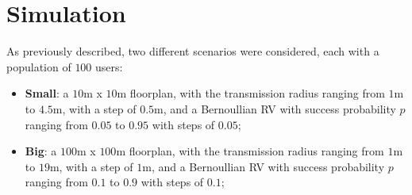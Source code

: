 %
\chapter{Simulation}\label{ch:simulation}
As previously described, two different scenarios were considered, each with a population of $100$ users:
\begin{itemize}
    \item \textbf{Small}: a $10$m x $10$m floorplan, with the transmission
    radius ranging from $1$m to $4.5$m, with a step of $0.5$m, and a Bernoullian
    RV with success probability $p$ ranging from $0.05$ to $0.95$ with steps of
    $0.05$;
    \item \textbf{Big}: a $100$m x $100$m floorplan, with the transmission
    radius ranging from $1$m to $19$m, with a step of $1$m, and a Bernoullian RV
    with success probability $p$ ranging from $0.1$ to $0.9$ with steps of $0.1$;
\end{itemize}
